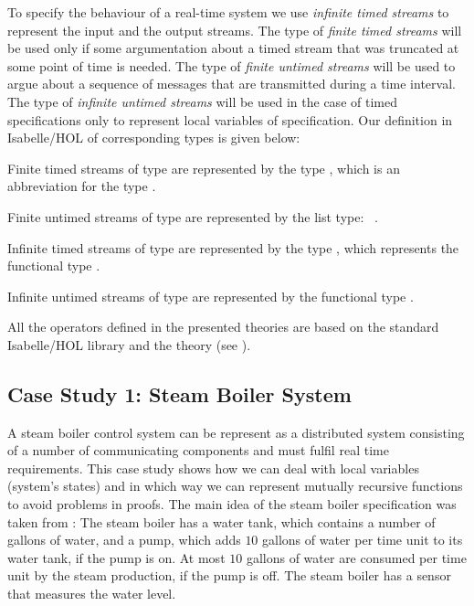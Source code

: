 To specify the behaviour of a real-time system we  use 
\emph{infinite timed streams} to represent the input and the output streams. 
The type of \emph{finite timed streams} will be used %
only if some argumentation about a timed stream that was truncated 
at some point of time is needed. 
The type of \emph{finite untimed streams} will be used to argue about a sequence of messages 
that are transmitted during a time interval.
The type of \emph{infinite untimed streams} will be used in the case of timed specifications 
only to represent local variables of \Focus specification.
Our definition in Isabelle/HOL of corresponding types is given below: 
%
\begin{itemize*}
%
\item 
Finite timed streams of type   are represented by the type ,  
which is an abbreviation for the type .
%
\item 
Finite untimed streams of type   are represented by the list type:~
.
%
\item 
Infinite timed streams of type   are represented by the type ,  
which represents the functional type .
%
\item 
Infinite untimed streams of type   are represented by 
the functional type .
%
\end{itemize*}
%
All the operators defined in the presented theories are based on the standard Isabelle/HOL library and  the theory  (see \cite{filter_thy}).
 

\subsection{Case Study 1: Steam Boiler System}

A steam boiler control system  can be represent as a distributed system 
consisting of a number of communicating components and must fulfil real time requirements. 
This case study shows how we can deal with local variables (system's states) and 
in which way we can represent mutually recursive functions to avoid problems in proofs.  
The main idea of the steam boiler specification was taken from \cite{focus}: 
The steam boiler has a water tank, which contains a number of gallons of water, and
a pump, which adds $10$ gallons of water per time unit to its water tank, 
if the pump is on. At most $10$ gallons of water are consumed per time unit by
the steam production, if the pump is off.
The steam boiler has a sensor that measures the water level. 

